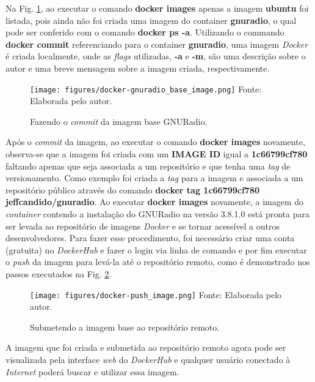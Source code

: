 \documentclass[
  12pt,				%
  openright,			%
  twoside,			%
  a4paper,			%
  english,			%
  french,				%
  spanish,			%
  brazil,				%
  ]{abntex2}
\begin{document}
Na Fig. \ref{fig:docker-gnuradio_base_image}, ao executar o comando \textbf{docker images} apenas a imagem \textbf{ubuntu}
foi listada, pois ainda não foi criada uma imagem do container \textbf{gnuradio}, o qual pode ser conferido com o comando
\textbf{docker ps -a}. Utilizando o commando \textbf{docker commit} referenciando para o container \textbf{gnuradio}, uma imagem
\textit{Docker} é criada localmente, onde as \textit{flags} utilizadas, \textbf{-a} e \textbf{-m}, são uma descrição
sobre o autor e uma breve mensagem sobre a imagem criada, respectivamente.

\begin{figure}[!htb]
  \centering
  \caption{Fazendo o \textit{commit} da imagem base GNURadio.}
  \texttt{[image: figures/docker-gnuradio\_base\_image.png]}
  Fonte: Elaborada pelo autor.
  \label{fig:docker-gnuradio_base_image}
\end{figure}

Após o \textit{commit} da imagem, ao executar o comando \textbf{docker images} novamente, observa-se que a imagem foi criada com
um \textbf{IMAGE ID} igual a \textbf{1c66799cf780} faltando apenas que seja associada a um repositório e que tenha uma \textit{tag} de versionamento.
Como exemplo foi criada a \textit{tag} para a imagem e associada a um repositório público através do comando \textbf{docker tag 1c66799cf780 jeffcandido/gnuradio}.
Ao executar \textbf{docker images} novamente, a imagem do \textit{container} contendo a instalação do GNURadio na versão 3.8.1.0
está pronta para ser levada ao repositório de imagens \textit{Docker} e se tornar acessível a outros desenvolvedores. Para
fazer esse procedimento, foi necessário criar uma conta (gratuita) no \textit{DockerHub} e fazer o login via linha de comando e por fim
executar o \textit{push} da imagem para levá-la até o repositório remoto, como é demonstrado nos passos executados na Fig. \ref{fig:docker-push_image}.

\begin{figure}[!htb]
  \centering
  \caption{Submetendo a imagem base ao repositório remoto.}
  \texttt{[image: figures/docker-push\_image.png]}
  Fonte: Elaborada pelo autor.
  \label{fig:docker-push_image}
\end{figure}

A imagem que foi criada e submetida ao repositório remoto agora pode ser visualizada pela interface \textit{web} do \textit{DockerHub} e qualquer usuário
conectado à \textit{Internet} poderá buscar e utilizar essa imagem.
\end{document}
